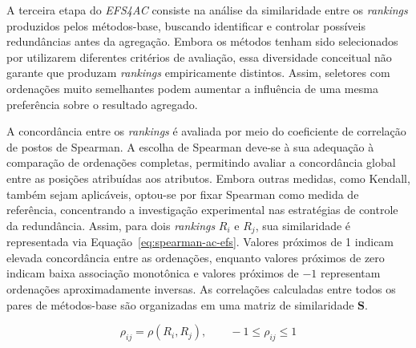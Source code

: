 A terceira etapa do \textit{EFS4AC} consiste na análise da similaridade entre os \textit{rankings} produzidos pelos métodos-base, buscando identificar e controlar possíveis redundâncias antes da agregação. Embora os métodos tenham sido selecionados por utilizarem diferentes critérios de avaliação, essa diversidade conceitual não garante que produzam \textit{rankings} empiricamente distintos. Assim, seletores com ordenações muito semelhantes podem aumentar a influência de uma mesma preferência sobre o resultado agregado.

A concordância entre os \textit{rankings} é avaliada por meio do coeficiente de correlação de postos de Spearman. A escolha de Spearman deve-se à sua adequação à comparação de ordenações completas, permitindo avaliar a concordância global entre as posições atribuídas aos atributos. Embora outras medidas, como Kendall, também sejam aplicáveis, optou-se por fixar Spearman como medida de referência, concentrando a investigação experimental nas estratégias de controle da redundância. Assim, para dois \textit{rankings} $R_i$ e $R_j$, sua similaridade é representada via Equação~\ref{eq:spearman-ac-efs}. Valores próximos de 1 indicam elevada concordância entre as ordenações, enquanto valores próximos de zero indicam baixa associação monotônica e valores próximos de $-1$ representam ordenações aproximadamente inversas. As correlações calculadas entre todos os pares de métodos-base são organizadas em uma matriz de similaridade $\mathbf{S}$.

\begin{equation}\label{eq:spearman-ac-efs}
    \rho_{ij}=\rho(R_i,R_j),
    \qquad -1\leq\rho_{ij}\leq1
\end{equation}

